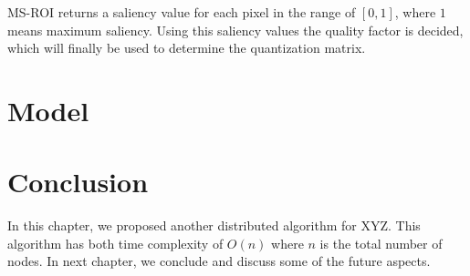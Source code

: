 MS-ROI returns a saliency value for each pixel in the range of $[0, 1]$, where $1$ means maximum saliency. Using this saliency values the quality factor is decided, which will finally be used to determine the quantization matrix.

\section{Model}



\section{Conclusion}
In this chapter, we proposed another distributed algorithm for
XYZ. This algorithm has both time complexity of $O(n)$ where $n$
is the total number of nodes.  In next chapter, we conclude and
discuss some of the future aspects.

